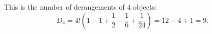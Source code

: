 This is the number of derangements of $4$ objects:
\[
D_4=4!\left(1-1+\dfrac{1}{2}-\dfrac{1}{6}+\dfrac{1}{24}\right)=12-4+1=\boxed{9}.
\]
